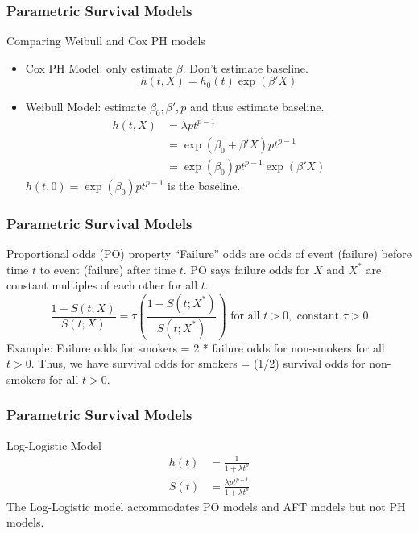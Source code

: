 \documentclass{beamer}
\theoremstyle{definition}
\begin{document}
\begin{frame}
\frametitle{Parametric Survival Models}
\begin{block}{Comparing Weibull and Cox PH models}
\begin{itemize}
\item Cox PH Model: only estimate $\beta$. Don't estimate baseline. 
\[ 
h(t,X) = h_0(t)\exp(\beta'X)
\]
\item Weibull Model: estimate $\beta_0, \beta', p$ and thus estimate baseline. 
\begin{align*} 
h(t,X) &= \lambda p  t^{p-1} \\
&=\exp(\beta_0 + \beta'X)p t^{p-1} \\
&=\exp(\beta_0)p t^{p-1} \exp(\beta'X) 
\end{align*}   
$h(t,0) = \exp(\beta_0)p t^{p-1}$ is the baseline. 
\end{itemize} 
\end{block}
\end{frame}

\begin{frame}
\frametitle{Parametric Survival Models}
\begin{block}{Proportional odds (PO) property}
``Failure'' odds are odds of event (failure) before time $t$ to event (failure) after time $t$. PO says failure odds for $X$ and $X^*$ are constant multiples of each other for all $t$.
\[ \frac{1- S(t;X)}{S(t;X)} = \tau \left(\frac{1- S(t;X^*)}{S(t;X^*)}\right)  \text{ for all } t>0, \text{ constant } \tau > 0
\]
Example: Failure odds for smokers = 2 * failure odds for non-smokers for all $t>0$. Thus, we have survival odds for smokers = (1/2) survival odds for non-smokers for all $t>0$.
\end{block}
\end{frame}

\begin{frame}
\frametitle{Parametric Survival Models}
\begin{block}{Log-Logistic Model}
\vspace{-20pt} 
\begin{align*} 
h(t)&=\frac{1}{1+\lambda t^p}  \\
S(t)&= \frac{\lambda p t^{p-1}}{1+\lambda t^p}
\end{align*} 
The Log-Logistic model accommodates PO models and AFT models but not PH models.
\end{block}
\end{frame}
\end{document}
